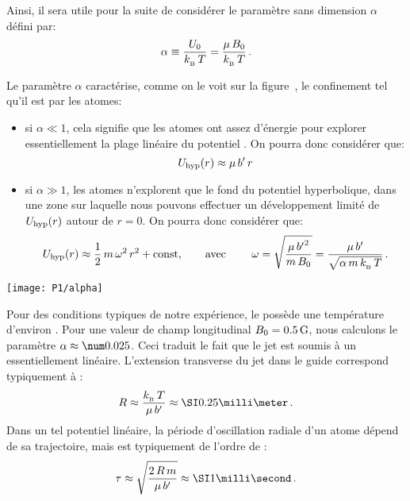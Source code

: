 \Resultat
{
\label{Rq:alpha}
Ainsi, il sera utile pour la suite de considérer le paramètre sans dimension $\alpha$ défini par:
\begin{equation}
	\alpha \equiv \frac{\Udef}{\kb\,T} =  \alphaexpr 
	\pointformule
	\label{eq:alpha}
\end{equation}
\finformule
}%
%

\casse

\noindent Le paramètre $\alpha$ caractérise, comme on le voit sur la figure~, le confinement tel qu'il est  par les atomes:
\begin{itemize}
	\item si $\alpha \ll 1$, cela signifie que les atomes ont assez d'énergie \thiq pour explorer essentiellement la plage linéaire du potentiel%
. 
On pourra donc considérer que: \[ {U_{\rm hyp}}(r) \approx \mu\,{b'}\,r \]
	\item si $\alpha \gg 1$, les atomes n'explorent que le fond du potentiel hyperbolique, dans une zone sur laquelle nous pouvons effectuer un développement limité de ${U_{\rm hyp}}(r)$ autour de $r=0$. On pourra donc considérer que: 
\[ 
{U_{\rm hyp}}(r) \approx \frac{1}{2} \, m \, \omega^2\,r^2 + {\mbox{const}}, \mbox{\qquad avec \qquad} \omega = \sqrt{\frac{\mu\,{b'}^2}{m\,{B_0}}} 
= \frac{\mu\,{b'}}{\sqrt{\alpha\,m\,{k_{_{\rm B}}}\,T}}
\, .
\]
\end{itemize}  


%
\bfighs
\texttt{[image: P1/alpha]}
\label{fig:alpha}
\efigh


\ApplicationNumerique
{Pour des conditions typiques de notre expérience, le \jat possède une température d'environ . Pour une valeur de champ longitudinal ${B_0}=\SI{0.5}{{\rm G}}$, nous calculons le paramètre $\alpha \approx \val{0.025}$. Ceci traduit le fait que le jet est soumis à un \ppt essentiellement linéaire.
L'extension transverse du jet dans le guide correspond typiquement à :
\RemonteUnPeuFig
\[
R \approx \frac{\kb\,T}{\mu\,\gradB} \approx \mm{0.25}
\pointformule
\RemonteUnPeuFig
\]
Dans un tel potentiel linéaire, la période d'oscillation radiale d'un atome dépend de sa trajectoire, mais est typiquement de l'ordre de :
\RemonteUnPeuFig
\[
\tau \approx \sqrt{\frac{2\,R\,m}{\mu\,\gradB}} \approx \ms{1}
\pointformule
\]
\finformule
}

